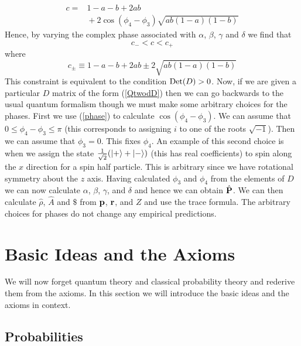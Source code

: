 \documentclass[12pt]{article}
\begin{document}
\begin{equation}\label{phase}
\begin{array}{ll}
\!\!c= & \!\!\!\!\!1-a-b+2ab \\[1pt]
\!\!                & \!\!\!\!\!
+2 \cos(\phi_4-\phi_3) \sqrt{ab(1-a)(1-b)}
\end{array}
\end{equation}
Hence, by varying the complex phase associated with $\alpha$, $\beta$, $\gamma$
and $\delta$ we find that
\begin{equation}\label{cpccm}
c_-< c < c_+
\end{equation}
where
\begin{equation}\label{Qroots}
c_{\pm}\equiv 1-a-b+2ab \pm 2\sqrt{ab(1-a)(1-b)}
\end{equation}
This constraint is equivalent to the condition ${\rm Det}(D) > 0$.
Now, if we are given a particular $D$ matrix of the form (\ref{QtwodD})
then we can go backwards to the usual quantum formalism though we must
make some arbitrary choices for the phases.
First we use (\ref{phase}) to calculate $\cos(\phi_4-\phi_3)$.  We can
assume that $0\leq \phi_4-\phi_3 \leq \pi$ (this corresponds to
assigning $i$ to one of the roots $\sqrt{-1}$).  Then we can assume
that $\phi_3=0$.  This fixes $\phi_4$.  An example of this second choice
is when we assign the state ${1\over\sqrt{2}}(|+\rangle+|-\rangle)$
(this has real coefficients) to spin along the $x$ direction for a spin
half particle.  This is arbitrary since we have rotational symmetry about
the $z$ axis.  Having calculated $\phi_3$ and $\phi_4$ from the elements
of $D$ we can now calculate $\alpha$, $\beta$, $\gamma$, and $\delta$
and hence we can obtain $\hat{\bf P}$. We can then
calculate $\hat{\rho}$,
$\hat{A}$ and $ \$ $ from ${\bf p}$, ${\bf r}$, and $Z$ and use the
trace formula.  The arbitrary choices for phases do not change any
empirical predictions.






\section{Basic Ideas and the Axioms}

We will now forget quantum theory and classical probability theory and
rederive them from the axioms.  In this section we will introduce the
basic ideas and the axioms in context.

\subsection{Probabilities}
\end{document}
